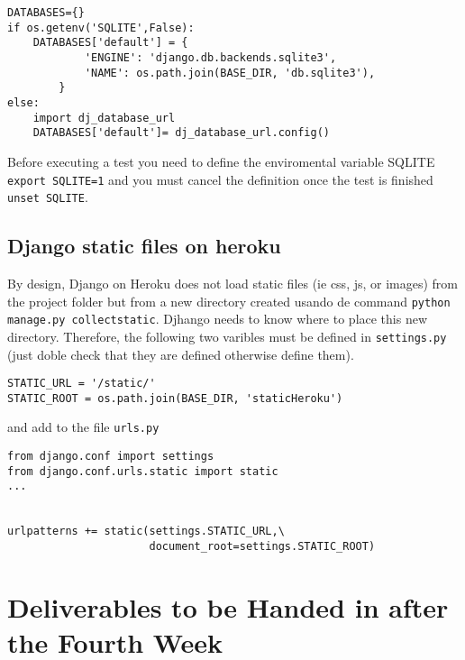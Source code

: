 \documentclass[12pt]{article} %
\begin{document}
\begin{verbatim}
DATABASES={}
if os.getenv('SQLITE',False):
    DATABASES['default'] = {
            'ENGINE': 'django.db.backends.sqlite3',
            'NAME': os.path.join(BASE_DIR, 'db.sqlite3'),
        }
else:
    import dj_database_url
    DATABASES['default']= dj_database_url.config()
\end{verbatim}



Before executing a test you need to define the enviromental variable SQLITE \texttt{export SQLITE=1} and you must cancel the definition once the test is finished \texttt{unset SQLITE}. 

\subsection{Django static files on heroku}
By design, Django on Heroku does not load static files  (ie css, js, or images) from the project folder but from a new directory created usando de command \texttt{python manage.py collectstatic}. Djhango needs to know where to place this new directory. Therefore, the following two varibles must be defined in \texttt{settings.py}  (just doble check that they are defined otherwise define them).

\begin{verbatim}
STATIC_URL = '/static/'
STATIC_ROOT = os.path.join(BASE_DIR, 'staticHeroku')
\end{verbatim}

and add to the file  \texttt{urls.py}
\begin{verbatim}
from django.conf import settings
from django.conf.urls.static import static
...


urlpatterns += static(settings.STATIC_URL,\
                      document_root=settings.STATIC_ROOT)

\end{verbatim}

\section{Deliverables to be Handed in after the Fourth Week}
\end{document}
